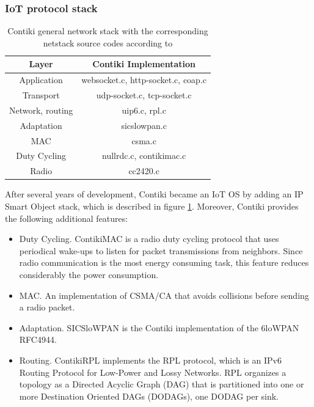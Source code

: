 \subsubsection{IoT protocol stack}
\begin{table}[]
	\centering
	\caption{Contiki general network stack with the corresponding netstack source codes according to \cite{contikiIPstack}}
	\label{tab:ContikiNetStack}
	\begin{tabular}{|c|c|}
		\hline
		\textbf{Layer}   & \textbf{Contiki Implementation}    \\ \hline
		Application      & websocket.c, http-socket.c, coap.c \\ \hline
		Transport        & udp-socket.c, tcp-socket.c         \\ \hline
		Network, routing & uip6.c, rpl.c                      \\ \hline
		Adaptation       & sicslowpan.c                       \\ \hline
		MAC              & csma.c                             \\ \hline
		Duty Cycling     & nullrdc.c, contikimac.c            \\ \hline
		Radio            & cc2420.c                           \\ \hline
	\end{tabular}
\end{table}
After several years of development, Contiki became an IoT OS by adding an IP Smart Object stack, which is described in figure \ref{tab:ContikiNetStack}.
Moreover, Contiki provides the following additional features:
\begin{itemize}
	\item Duty Cycling. ContikiMAC\cite{dunkels2011contikimac} is a radio duty cycling protocol that uses periodical wake-ups to listen for packet transmissions from neighbors.
	Since radio communication is the most energy consuming task, this feature reduces considerably the power consumption.
	\item MAC. An implementation of CSMA/CA that avoids collisions before sending a radio packet.
	\item Adaptation. SICSloWPAN is the Contiki implementation of the 6loWPAN RFC4944\cite{rfc4944}.
	\item Routing. ContikiRPL\cite{tsiftes2010contikirpl} implements the RPL\cite{rfc6550} protocol, which is an IPv6 Routing Protocol for Low-Power and Lossy Networks. RPL organizes a	topology as a Directed Acyclic Graph (DAG) that is partitioned into one or more Destination Oriented DAGs (DODAGs), one DODAG per sink.
\end{itemize}

